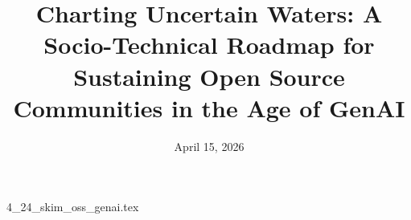 \documentclass{article}      %
\title{Charting Uncertain Waters: A Socio-Technical Roadmap for Sustaining Open Source Communities in the Age of GenAI}  %
\date{April 15, 2026}
\begin{document}

\maketitle                   %



{4_24_skim_oss_genai.tex}
\printbibliography
\end{document}
